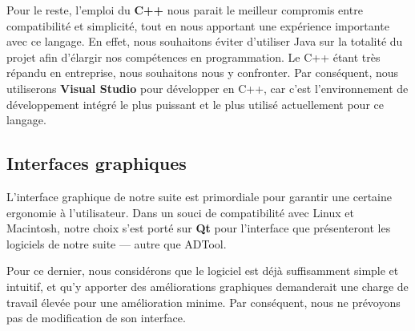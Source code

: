        	Pour le reste, l'emploi du {\bf C++} nous parait le meilleur compromis entre compatibilité et simplicité, tout en nous apportant une expérience importante avec ce langage. En effet, nous souhaitons éviter d'utiliser Java sur la totalité du projet afin d'élargir nos compétences en programmation. Le C++ étant très répandu en entreprise, nous souhaitons nous y confronter. Par conséquent, nous utiliserons {\bf Visual Studio} pour développer en C++, car c'est l'environnement de développement intégré le plus puissant et le plus utilisé actuellement pour ce langage.

    \subsection{Interfaces graphiques}
        L'interface graphique de notre suite est primordiale pour garantir une certaine ergonomie à l'utilisateur. Dans un souci de compatibilité avec Linux et Macintosh, notre choix s'est porté sur {\bf Qt} pour l'interface que présenteront les logiciels de notre suite --- autre que ADTool. 
        
        Pour ce dernier, nous considérons que le logiciel est déjà suffisamment simple et intuitif, et qu'y apporter des améliorations graphiques demanderait une charge de travail élevée pour une amélioration minime. Par conséquent, nous ne prévoyons pas de modification de son interface.